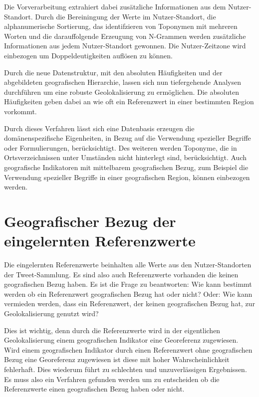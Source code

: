 			Die Vorverarbeitung extrahiert dabei zusätzliche Informationen aus dem Nutzer-Standort.
			Durch die Bereiningung der Werte im Nutzer-Standort, die alphanumerische Sortierung, das identifzieren von Toponymen mit mehreren Worten und die darauffolgende Erzeugung von N-Grammen werden zusätzliche Informationen aus jedem Nutzer-Standort gewonnen.
			Die Nutzer-Zeitzone wird einbezogen um Doppeldeutigkeiten auflösen zu können.

			Durch die neue Datenstruktur, mit den absoluten Häufigkeiten und der abgebildeten geografischen Hierarchie, lassen sich nun tiefergehende Analysen durchführen um eine robuste Geolokalisierung zu ermöglichen. 
			Die absoluten Häufigkeiten geben dabei an wie oft ein Referenzwert in einer bestimmten Region vorkommt.

			Durch dieses Verfahren lässt sich eine Datenbasis erzeugen die domänenspezifische Eigenheiten, in Bezug auf die Verwendung spezieller Begriffe oder Formulierungen, berücksichtigt.
			Des weiteren werden Toponyme, die in Ortsverzeichnissen unter Umständen nicht hinterlegt sind, berücksichtigt.
			Auch geografische Indikatoren mit mittelbarem geografischen Bezug, zum Beispiel die Verwendung spezieller Begriffe in einer geografischen Region, können einbezogen werden. 

	\section{Geografischer Bezug der eingelernten Referenzwerte} \label{sec:geografischerBezug} 
			
		Die eingelernten Referenzwerte beinhalten alle Werte aus den Nutzer-Standorten der Tweet-Sammlung.
		Es sind also auch Referenzwerte vorhanden die keinen geografischen Bezug haben.
		Es ist die Frage zu beantworten: Wie kann bestimmt werden ob ein Referenzwert geografischen Bezug hat oder nicht?
		Oder: Wie kann vermieden werden, dass ein Referenzwert, der keinen geografischen Bezug hat, zur Geolokalisierung genutzt wird?
		
		Dies ist wichtig, denn durch die Referenzwerte wird in der eigentlichen Geolokalisierung einem geografischen Indikator eine Georeferenz zugewiesen. 
		Wird einem geografischen Indikator durch einen Referenzwert ohne geografischen Bezug eine Georeferenz zugewiesen ist diese mit hoher Wahrscheinlichkeit fehlerhaft.
		Dies wiederum führt zu schlechten und unzuverlässigen Ergebnissen.
		Es muss also ein Verfahren gefunden werden um zu entscheiden ob die Referenzwerte einen geografischen Bezug haben oder nicht.

